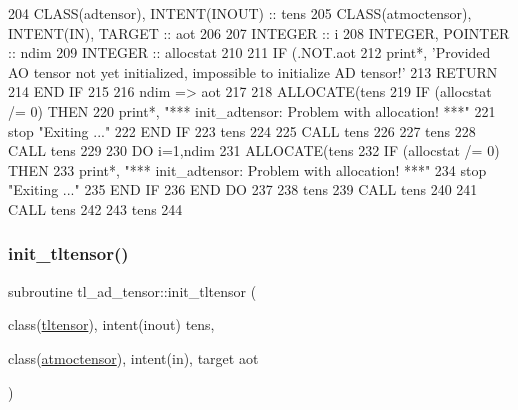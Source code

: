 \begin{DoxyCode}
204     \textcolor{keywordtype}{CLASS}(adtensor), \textcolor{keywordtype}{INTENT(INOUT)} :: tens
205     \textcolor{keywordtype}{CLASS}(atmoctensor), \textcolor{keywordtype}{INTENT(IN)}, \textcolor{keywordtype}{TARGET} :: aot
206 
207     \textcolor{keywordtype}{INTEGER} :: i
208     \textcolor{keywordtype}{INTEGER}, \textcolor{keywordtype}{POINTER} :: ndim
209     \textcolor{keywordtype}{INTEGER} :: allocstat
210 
211     \textcolor{keywordflow}{IF} (.NOT.aot%
212       print*, \textcolor{stringliteral}{'Provided AO tensor not yet initialized, impossible to initialize AD tensor!'}
213       \textcolor{keywordflow}{RETURN}
214 \textcolor{keywordflow}{    END IF}
215 
216     ndim => aot%
217 
218     \textcolor{keyword}{ALLOCATE}(tens%
219     \textcolor{keywordflow}{IF} (allocstat /= 0) \textcolor{keywordflow}{THEN}
220         print*, \textcolor{stringliteral}{"*** init\_adtensor: Problem with allocation! ***"}
221         stop \textcolor{stringliteral}{"Exiting ..."}
222 \textcolor{keywordflow}{    END IF}
223     tens%
224 
225     \textcolor{keyword}{CALL }tens%
226 
227     tens%
228     \textcolor{keyword}{CALL }tens%
229 
230     \textcolor{keywordflow}{DO} i=1,ndim
231       \textcolor{keyword}{ALLOCATE}(tens%
232       \textcolor{keywordflow}{IF} (allocstat /= 0) \textcolor{keywordflow}{THEN}
233         print*, \textcolor{stringliteral}{"*** init\_adtensor: Problem with allocation! ***"}
234         stop \textcolor{stringliteral}{"Exiting ..."}
235 \textcolor{keywordflow}{      END IF}
236 \textcolor{keywordflow}{    END DO}
237 
238     tens%
239     \textcolor{keyword}{CALL }tens%
240 
241     \textcolor{keyword}{CALL }tens%
242 
243     tens%
244 
\end{DoxyCode}
\mbox{\label{namespacetl__ad__tensor_a9acec8b42123cf3f8304a5556fa2e295}} 
\subsubsection{\texorpdfstring{init\+\_\+tltensor()}{init\_tltensor()}}
{\footnotesize\ttfamily subroutine tl\+\_\+ad\+\_\+tensor\+::init\+\_\+tltensor (\begin{DoxyParamCaption}\item[{class(\hyperlink{structtl__ad__tensor_1_1tltensor}{tltensor}), intent(inout)}]{tens,  }\item[{class(\hyperlink{structaotensor__def_1_1atmoctensor}{atmoctensor}), intent(in), target}]{aot }\end{DoxyParamCaption})\hspace{0.3cm}{\ttfamily [private]}}



